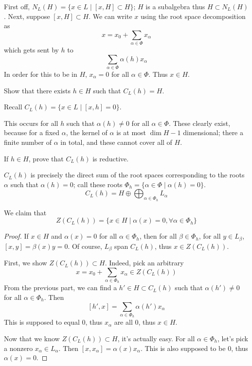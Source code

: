 \documentclass[11pt, headheight=30pt]{scrartcl}
\begin{document}
First off, $N_L(H) = \{x\in L \mid [x,H] \subset H\}$; $H$ is a subalgebra
thus $H\subset N_L(H)$. Next, suppose $[x,H]\subset H$. We can write
$x$ using the root space decomposition as
\[
    x = x_0 + \sum_{\alpha\in \Phi} x_\alpha    
\]
which gets sent by $h$ to
\[
    \sum_{\alpha\in \Phi} \alpha(h) x_\alpha    
\]
In order for this to be in $H$, $x_\alpha = 0$ for
all $\alpha\in \Phi$. Thus $x\in H$.


\begin{prob}
    Show that there exists $h \in H$ such that $C_L(h) = H$.
\end{prob}

Recall $C_L(h) = \{x\in L\mid [x,h] = 0\}$.

This occurs for all $h$ such that $\alpha(h) \neq 0$
for all $\alpha\in \Phi$. These clearly exist,
because for a fixed $\alpha$, the kernel of $\alpha$
is at most $\dim H - 1$ dimensional; there a finite
number of $\alpha$ in total, and these cannot cover
all of $H$.

\begin{prob}
    If $h \in H$, prove that $C_L(h)$ is reductive.
\end{prob}
$C_L(h)$ is precisely the direct sum of the root spaces
corresponding to the roots $\alpha$ such that $\alpha(h) = 0$;
call these roots $\Phi_h = \{\alpha\in\Phi\mid\alpha(h)=0\}$.
\[
    C_L(h) = H\oplus \bigoplus_{\alpha \in \Phi_h} L_\alpha
\]
\begin{claim*}
We claim that
\[
  Z(C_L(h)) = \{x\in H\mid \alpha(x) = 0, \forall\alpha\in\Phi_h\}
\]
\end{claim*}
\begin{proof}
If $x\in H$ and $\alpha(x) = 0$
for all $\alpha\in\Phi_h$, then for
all $\beta \in \Phi_h$, for all $y\in L_\beta$,
$[x, y] = \beta(x)y = 0$. Of course, $L_\beta$
span $C_L(h)$, thus $x\in Z(C_L(h))$.

\begin{psec*}
    First, we show $Z(C_L(h))\subset H$.
    Indeed, pick an arbitrary
    \[
        x= x_0+ \sum_{\alpha\in\Phi_h} x_{\alpha} \in Z(C_L(h))
    \]
    From the previous part, we can find a $h'\in H\subset C_L(h)$
    such that $\alpha(h') \neq 0$ for all $\alpha\in\Phi_h$.
    Then
    \[
        [h',x] = \sum_{\alpha\in\Phi_h} \alpha(h')x_{\alpha}
    \]
    This is supposed to equal $0$, thus $x_\alpha$ are all $0$,
    thus $x\in H$.
\end{psec*}

Now that we know $Z(C_L(h))\subset H$, it's actually easy.
For all $\alpha \in \Phi_h$, let's
pick a nonzero $x_\alpha \in L_\alpha$.
Then $[x,x_\alpha] = \alpha(x)x_\alpha$.
This is also supposed to be $0$, thus $\alpha(x) = 0$.
\end{proof}
\end{document}
